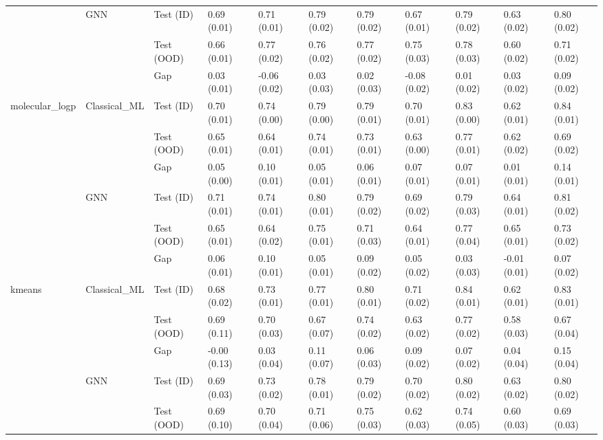 \begin{tabular}{lllllllllll}
\cline{2-11}
 & \multirow[t]{3}{*}{GNN} & Test (ID) & 0.69 (0.01) & 0.71 (0.01) & 0.79 (0.02) & 0.79 (0.02) & 0.67 (0.01) & 0.79 (0.02) & 0.63 (0.02) & 0.80 (0.02) \\
 &  & Test (OOD) & 0.66 (0.01) & 0.77 (0.02) & 0.76 (0.02) & 0.77 (0.02) & 0.75 (0.03) & 0.78 (0.03) & 0.60 (0.02) & 0.71 (0.02) \\
 &  & Gap & 0.03 (0.01) & -0.06 (0.02) & 0.03 (0.03) & 0.02 (0.03) & -0.08 (0.02) & 0.01 (0.02) & 0.03 (0.02) & 0.09 (0.02) \\
\cline{1-11} \cline{2-11}
\multirow[t]{6}{*}{molecular_logp} & \multirow[t]{3}{*}{Classical_ML} & Test (ID) & 0.70 (0.01) & 0.74 (0.00) & 0.79 (0.00) & 0.79 (0.01) & 0.70 (0.01) & 0.83 (0.00) & 0.62 (0.01) & 0.84 (0.01) \\
 &  & Test (OOD) & 0.65 (0.01) & 0.64 (0.01) & 0.74 (0.01) & 0.73 (0.01) & 0.63 (0.00) & 0.77 (0.01) & 0.62 (0.02) & 0.69 (0.02) \\
 &  & Gap & 0.05 (0.00) & 0.10 (0.01) & 0.05 (0.01) & 0.06 (0.01) & 0.07 (0.01) & 0.07 (0.01) & 0.01 (0.01) & 0.14 (0.01) \\
\cline{2-11}
 & \multirow[t]{3}{*}{GNN} & Test (ID) & 0.71 (0.01) & 0.74 (0.01) & 0.80 (0.01) & 0.79 (0.02) & 0.69 (0.02) & 0.79 (0.03) & 0.64 (0.01) & 0.81 (0.02) \\
 &  & Test (OOD) & 0.65 (0.01) & 0.64 (0.02) & 0.75 (0.01) & 0.71 (0.03) & 0.64 (0.01) & 0.77 (0.04) & 0.65 (0.01) & 0.73 (0.02) \\
 &  & Gap & 0.06 (0.01) & 0.10 (0.01) & 0.05 (0.01) & 0.09 (0.02) & 0.05 (0.02) & 0.03 (0.03) & -0.01 (0.01) & 0.07 (0.02) \\
\cline{1-11} \cline{2-11}
\multirow[t]{6}{*}{kmeans} & \multirow[t]{3}{*}{Classical_ML} & Test (ID) & 0.68 (0.02) & 0.73 (0.01) & 0.77 (0.01) & 0.80 (0.01) & 0.71 (0.02) & 0.84 (0.01) & 0.62 (0.01) & 0.83 (0.01) \\
 &  & Test (OOD) & 0.69 (0.11) & 0.70 (0.03) & 0.67 (0.07) & 0.74 (0.02) & 0.63 (0.02) & 0.77 (0.02) & 0.58 (0.03) & 0.67 (0.04) \\
 &  & Gap & -0.00 (0.13) & 0.03 (0.04) & 0.11 (0.07) & 0.06 (0.03) & 0.09 (0.02) & 0.07 (0.02) & 0.04 (0.04) & 0.15 (0.04) \\
\cline{2-11}
 & \multirow[t]{3}{*}{GNN} & Test (ID) & 0.69 (0.03) & 0.73 (0.02) & 0.78 (0.01) & 0.79 (0.02) & 0.70 (0.02) & 0.80 (0.02) & 0.63 (0.02) & 0.80 (0.02) \\
 &  & Test (OOD) & 0.69 (0.10) & 0.70 (0.04) & 0.71 (0.06) & 0.75 (0.03) & 0.62 (0.03) & 0.74 (0.05) & 0.60 (0.03) & 0.69 (0.03) \\

\end{tabular}
